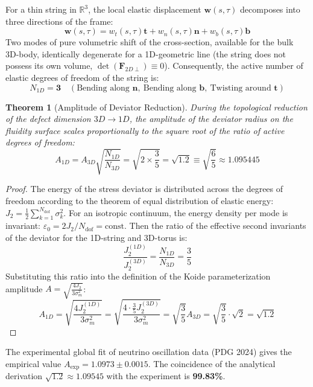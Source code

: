 \documentclass[12pt,a4paper]{article}
\newtheorem{theorem}{Theorem}
\begin{document}
	For a thin string in $\mathbb{R}^3$, the local elastic displacement $\mathbf{w}(s, \tau)$ decomposes into three directions of the frame:
	\begin{equation}
		\mathbf{w}(s, \tau) = w_t(s, \tau) \mathbf{t} + w_n(s, \tau) \mathbf{n} + w_b(s, \tau) \mathbf{b}
	\end{equation}
	Two modes of pure volumetric shift of the cross-section, available for the bulk 3D-body, identically degenerate for a 1D-geometric line (the string does not possess its own volume, $\det(\mathbf{F}_{2D \perp}) \equiv 0$). 
	Consequently, the active number of elastic degrees of freedom of the string is:
	\begin{equation}
		N_{1D} = \mathbf{3} \quad (\text{Bending along } \mathbf{n}, \ \text{Bending along } \mathbf{b}, \ \text{Twisting around } \mathbf{t})
	\end{equation}
	
	\begin{theorem}[Amplitude of Deviator Reduction]
		During the topological reduction of the defect dimension $3D \to 1D$, the amplitude of the deviator radius on the fluidity surface scales proportionally to the square root of the ratio of active degrees of freedom:
		\begin{equation}
			A_{1D} = A_{3D} \sqrt{\frac{N_{1D}}{N_{3D}}} = \sqrt{2 \times \frac{3}{5}} = \mathbf{\sqrt{1.2}} \equiv \sqrt{\frac{6}{5}} \approx 1.095445
		\end{equation}
	\end{theorem}
	
	\begin{proof}
		The energy of the stress deviator is distributed across the degrees of freedom according to the theorem of equal distribution of elastic energy: $J_2 = \frac{1}{2}\sum_{k=1}^{N_{\text{dof}}} \sigma_k^2$. 
		For an isotropic continuum, the energy density per mode is invariant: $\varepsilon_0 = 2 J_2 / N_{\text{dof}} = \text{const}$.
		Then the ratio of the effective second invariants of the deviator for the 1D-string and 3D-torus is:
		\begin{equation}
			\frac{J_2^{(1D)}}{J_2^{(3D)}} = \frac{N_{1D}}{N_{3D}} = \frac{3}{5}
		\end{equation}
		Substituting this ratio into the definition of the Koide parameterization amplitude $A = \sqrt{\frac{4 J_2}{3 \sigma_m^2}}$:
		\begin{equation}
			A_{1D} = \sqrt{\frac{4 J_2^{(1D)}}{3 \sigma_m^2}} = \sqrt{\frac{4 \cdot \frac{3}{5} J_2^{(3D)}}{3 \sigma_m^2}} = \sqrt{\frac{3}{5}} A_{3D} = \sqrt{\frac{3}{5}} \cdot \sqrt{2} = \mathbf{\sqrt{1.2}}
		\end{equation}
		\end{proof}	
		The experimental global fit of neutrino oscillation data (PDG 2024) gives the empirical value $A_{\text{exp}} = 1.0973 \pm 0.0015$. The coincidence of the analytical derivation $\sqrt{1.2} \approx 1.09545$ with the experiment is \textbf{99.83\%}.
		
\end{document}
